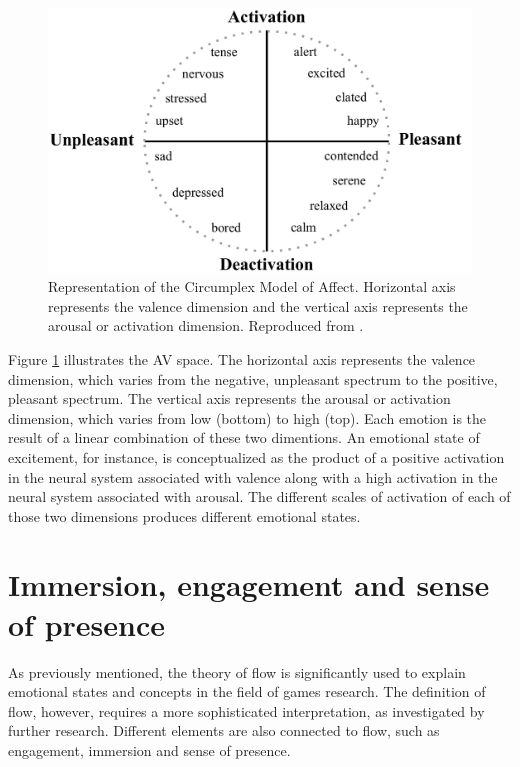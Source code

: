 \begin{figure}[h!]
    \centering
    \includegraphics[scale=0.5]{Content/figures/russell-av}
    \caption{Representation of the Circumplex Model of Affect. Horizontal axis represents the valence dimension and the vertical axis represents the arousal or activation dimension. Reproduced from \textcite{posner2005circumplex}.}
    \label{fig:av-model}
\end{figure}

Figure \ref{fig:av-model} illustrates the AV space. The horizontal axis represents the valence dimension, which varies from the negative, unpleasant spectrum to the positive, pleasant spectrum. The vertical axis represents the arousal or activation dimension, which varies from low (bottom) to high (top). Each emotion is the result of a linear combination of these two dimentions. An emotional state of excitement, for instance, is conceptualized as the product of a positive activation in the neural system associated with valence along with a high activation in the neural system associated with arousal. The different scales of activation of each of those two dimensions produces different emotional states.

\section{Immersion, engagement and sense of presence}

As previously mentioned, the theory of flow is significantly used to explain emotional states and concepts in the field of games research. The definition of flow, however, requires a more sophisticated interpretation, as investigated by further research. %
Different elements are also connected to flow, such as engagement, immersion and sense of presence.

